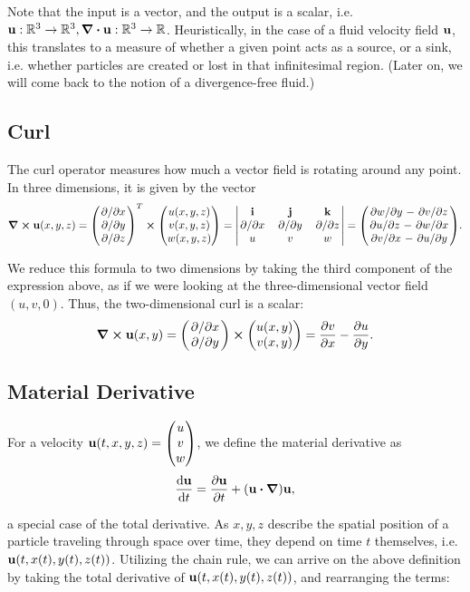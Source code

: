 Note that the input is a vector, and the output is a scalar, i.e. $\vb{u}:
\mathbb{R}^3 \to \mathbb{R}^3, \div{\vb{u}}: \mathbb{R}^3\to\mathbb{R}$.
Heuristically, in the case of a fluid velocity field $\vb{u}$, this translates
to a measure of whether a given point acts as a source, or a sink, i.e. whether
particles are created or lost in that infinitesimal region. (Later on, we will
come back to the notion of a divergence-free fluid.)

\subsection*{Curl}\label{section:curl}
The curl operator measures how much a vector field is rotating around any point. 
In three dimensions, it is given by the vector
$$\curl{\vb{u}(x,y,z) = 
    \mqty(\pdv*{x} \\ \pdv*{y} \\  \pdv*{z})^T \cross 
    \mqty(u(x,y,z) \\ v(x,y,z) \\ w(x,y,z))
= \mqty|
    \vb{i}   & \vb{j}   & \vb{k}   \\
    \pdv*{x} & \pdv*{y} & \pdv*{z} \\
    u        & v        & w
|} = \mqty(
\pdv*{w}{y} - \pdv*{v}{z} \\
\pdv*{u}{z} - \pdv*{w}{x} \\
\pdv*{v}{x} - \pdv*{u}{y}
).$$

We reduce this formula to two dimensions by taking the third component of
the expression above, as if we were looking at the three-dimensional vector
field $(u,v,0)$. Thus, the two-dimensional curl is a scalar:
$$\curl{\vb{u}(x,y)} = 
    \mqty(\pdv*{x} \\ \pdv*{y}) \cross 
    \mqty(u(x,y) \\ v(x,y))
    = \pdv{v}{x} - \pdv{u}{y}.$$

\subsection*{Material Derivative}
For a velocity $\vb{u}(t,x,y,z) = \mqty(u \\ v \\ w)$, 
we define the material derivative as 
$$\dv{\vb{u}}{t} = \pdv{\vb{u}}{t} + \qty(\vb{u}\vdot\grad)\vb{u} ,$$

a special case of the total derivative. As $x, y, z$ describe the spatial
position of a particle traveling through space over time, they depend on time
$t$ themselves, i.e. $\vb{u}(t, x(t), y(t), z(t))$. Utilizing the chain rule,
we can arrive on the above definition by taking the total derivative of
$\vb{u}(t, x(t), y(t), z(t))$, and rearranging the terms:

